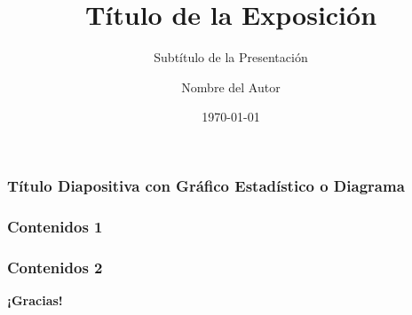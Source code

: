 \documentclass[aspectratio=169]{beamer}
\title{Título de la Exposición}
\subtitle{Subtítulo de la Presentación}
\author{Nombre del Autor}
\institute{UNAD}
\date{\today}
\institute{Unidad/Zona/Grupo o Equipo Funcional}
\begin{document}
{%
	\frame{\titlepage}
}

\begin{frame}[t]\frametitle{Título Diapositiva con Gráfico Estadístico o Diagrama}

\end{frame}

\begin{frame}[t]\frametitle{Contenidos 1}

\end{frame}

\begin{frame}[t]\frametitle{Contenidos 2}

\end{frame}

{%
	\begin{frame}
		\vskip3.2cm
		\centering
		\Huge\textbf{¡Gracias!}
	\end{frame}
	
}
\end{document}
